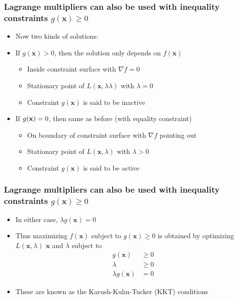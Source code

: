 \documentclass[12pt,notes,mathserif]{beamer}
\begin{document}
\begin{frame}[c]
	\frametitle{Lagrange multipliers can also be used with inequality constraints $g(\mathbf{x})\geqslant{}0$}
	\begin{itemize}
		\item Now two kinds of solutions:
		\item If $g(\mathbf{x})> 0$, then the solution only depends on $f(\mathbf{x})$
		      \begin{itemize}
			      \item Inside constraint surface with $\nabla f= 0$
			      \item Stationary point of $L(\mathbf{x},𝜆\lambda)$ with $\lambda= 0$
			      \item Constraint $g(\mathbf{x})$ is said to be inactive
		      \end{itemize}
		\item If $g(\mathbf{x})= 0$, then same as before (with equality constraint)
		      \begin{itemize}
			      \item On boundary of constraint surface with $\nabla f$ pointing out
			      \item Stationary point of $L(\mathbf{x},\lambda)$ with $\lambda> 0$
			      \item Constraint $g(\mathbf{x})$ is said to be active
		      \end{itemize}

	\end{itemize}
\end{frame}


\begin{frame}[c]
	\frametitle{Lagrange multipliers can also be used with inequality constraints $g(\mathbf{x})\geqslant{}0$}
	\begin{itemize}
		\item In either case, $\lambda g(\mathbf{x})=0$
		\item Thus maximizing $f(\mathbf{x})$ subject to $g(\mathbf{x})\geqslant{}0$ is obtained by optimizing $L(\mathbf{x},\lambda)$ \wrt $\mathbf{x}$ and $\lambda$ subject to
		      \[
			      \begin{array}{cc}
				      g(\mathbf{x})         & \geqslant{}0 \\
				      \lambda               & \geqslant{}0 \\
				      \lambda g(\mathbf{x}) & =0
			      \end{array}
		      \]
		\item These are known as the Karush-Kuhn-Tucker (KKT) conditions
	\end{itemize}
\end{frame}
\end{document}
